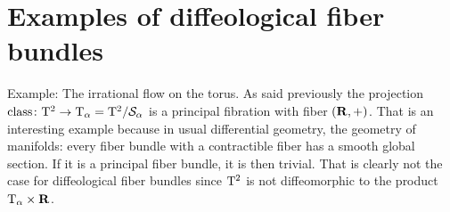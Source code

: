 \section{Examples of diffeological fiber bundles}

\begin{Article}{Example: The irrational flow on the torus.}{}
  As said previously the projection $\operatorname{class} \colon \mathrm{T}^2 \to \mathrm{T}_\alpha = \mathrm{T}^2/\mathcal{S}_\alpha$ is a principal fibration with fiber $(\mathbf{R},+)$.
  That is an interesting example because in usual differential geometry,
  the geometry of manifolds:
  every fiber bundle with a contractible fiber has a smooth global section.
  If it is a principal fiber bundle,
  it is then trivial.
  That is clearly not the case for diffeological fiber bundles since $\mathrm{T}^2$ is not diffeomorphic to the product $\mathrm{T}_\alpha \times \mathbf{R}$.
\end{Article}

